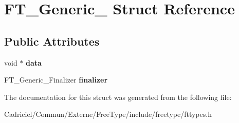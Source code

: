\hypertarget{struct_f_t___generic__}{\section{F\-T\-\_\-\-Generic\-\_\- Struct Reference}
\label{struct_f_t___generic__}
}
\subsection*{Public Attributes}
\begin{DoxyCompactItemize}
\item 
\hypertarget{struct_f_t___generic___af0bf8b983254b662f293e9a20505e27e}{void $\ast$ {\bfseries data}}\label{struct_f_t___generic___af0bf8b983254b662f293e9a20505e27e}

\item 
\hypertarget{struct_f_t___generic___a20fce8de90cc9e3876935817247b9ccc}{F\-T\-\_\-\-Generic\-\_\-\-Finalizer {\bfseries finalizer}}\label{struct_f_t___generic___a20fce8de90cc9e3876935817247b9ccc}

\end{DoxyCompactItemize}


The documentation for this struct was generated from the following file\-:\begin{DoxyCompactItemize}
\item 
Cadriciel/\-Commun/\-Externe/\-Free\-Type/include/freetype/fttypes.\-h\end{DoxyCompactItemize}
